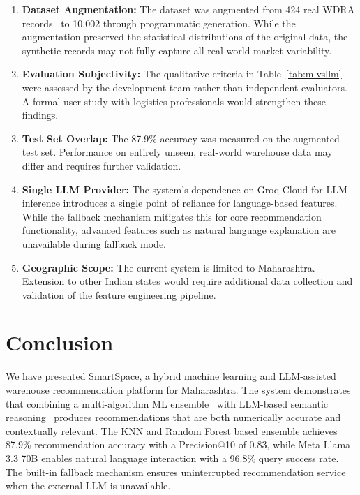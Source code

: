 \documentclass[pdflatex,sn-mathphys-num]{sn-jnl}
\theoremstyle{thmstyleone}
\theoremstyle{thmstyletwo}
\theoremstyle{thmstylethree}
\begin{document}
\begin{enumerate}
    \item \textbf{Dataset Augmentation:} The dataset was augmented from 424 real WDRA records~\cite{b14} to 10,002 through programmatic generation. While the augmentation preserved the statistical distributions of the original data, the synthetic records may not fully capture all real-world market variability.

    \item \textbf{Evaluation Subjectivity:} The qualitative criteria in Table~\ref{tab:mlvsllm} were assessed by the development team rather than independent evaluators. A formal user study with logistics professionals would strengthen these findings.

    \item \textbf{Test Set Overlap:} The 87.9\% accuracy was measured on the augmented test set. Performance on entirely unseen, real-world warehouse data may differ and requires further validation.

    \item \textbf{Single LLM Provider:} The system's dependence on Groq Cloud for LLM inference introduces a single point of reliance for language-based features. While the fallback mechanism mitigates this for core recommendation functionality, advanced features such as natural language explanation are unavailable during fallback mode.

    \item \textbf{Geographic Scope:} The current system is limited to Maharashtra. Extension to other Indian states would require additional data collection and validation of the feature engineering pipeline.
\end{enumerate}


\section{Conclusion}\label{sec6}

We have presented SmartSpace, a hybrid machine learning and LLM-assisted warehouse recommendation platform for Maharashtra. The system demonstrates that combining a multi-algorithm ML ensemble~\cite{b6, b11, b12} with LLM-based semantic reasoning~\cite{b13} produces recommendations that are both numerically accurate and contextually relevant. The KNN and Random Forest based ensemble achieves 87.9\% recommendation accuracy with a Precision@10 of 0.83, while Meta Llama 3.3 70B enables natural language interaction with a 96.8\% query success rate. The built-in fallback mechanism ensures uninterrupted recommendation service when the external LLM is unavailable.
\end{document}
